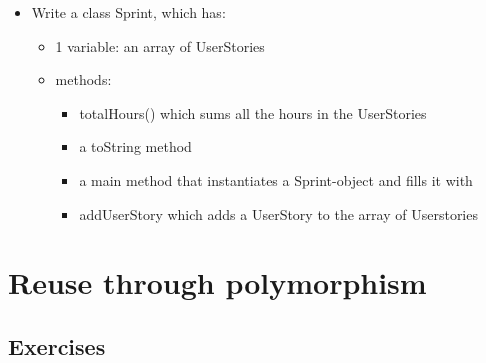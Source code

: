 \begin{enumerate}
\begin{itemize}
                    \item Write a class Sprint, which has:
                         \begin{itemize}
                            \item 1 variable: an array of UserStories
                            \item methods:
                            \begin{itemize}
                                \item totalHours() which sums all the hours in the UserStories
                                \item a toString method
                                \item a main method that instantiates a Sprint-object and fills it with
                                \item addUserStory which adds a UserStory to the array of Userstories
                        \end{itemize}
                    \end{itemize}
                \end{itemize}
    \end{enumerate}

\chapter{Reuse through polymorphism}


    \section{Exercises}

